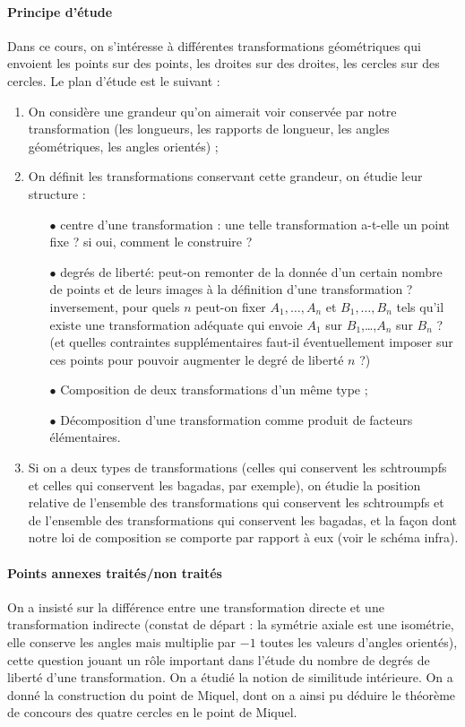\ifcourt

\paragraph{Principe d'étude} Dans ce cours, on s'intéresse à différentes transformations géométriques qui envoient
les points sur des points, les droites sur des droites, les cercles sur des cercles. Le plan
d'étude est le suivant :
\begin{enumerate}
\item On considère une grandeur qu'on aimerait voir conservée par notre transformation 
(les longueurs, les rapports de longueur, les angles géométriques, les angles orientés) ;
\item On définit les transformations conservant cette grandeur, on étudie leur structure :
\begin{itemize}
\item[$\bullet$] centre d'une transformation : une telle transformation a-t-elle un point fixe ? si oui, comment le construire ? 
\item[$\bullet$] \og degrés de liberté\fg : peut-on remonter de la donnée
d'un certain nombre de points et de leurs images à la définition d'une transformation ?
inversement, pour quels $n$ peut-on fixer $A_1,\ldots,A_n$ et $B_1,\ldots,B_n$ tels qu'il
existe une transformation adéquate qui envoie $A_1$ sur $B_1$,\ldots,$A_n$ sur $B_n$ ?
(et quelles contraintes supplémentaires faut-il éventuellement imposer sur ces points pour
pouvoir augmenter le degré de liberté $n$ ?)
\item[$\bullet$] Composition de deux transformations d'un même type ;
\item[$\bullet$] Décomposition d'une transformation comme produit de facteurs \og élémentaires\fg.
\end{itemize}
\item Si on a deux types de transformations (celles qui conservent les schtroumpfs et celles
qui conservent les bagadas, par exemple), on étudie la position relative de l'ensemble
des transformations qui conservent les schtroumpfs et de l'ensemble des transformations qui 
conservent les bagadas, et la façon dont notre loi de composition se comporte par rapport 
à eux (voir le schéma infra).
\end{enumerate}

\paragraph{Points annexes traités/non traités} On a insisté sur la différence entre une 
transformation directe et une transformation indirecte (constat de
départ : la symétrie axiale est une isométrie, elle conserve les angles mais 
multiplie par $-1$ toutes les valeurs d'angles orientés), cette question jouant un
rôle important dans l'étude du nombre de degrés de liberté d'une transformation. 
On a étudié la notion de similitude intérieure. On a donné la construction du 
point de Miquel, dont on a ainsi pu déduire le théorème de concours des quatre 
cercles en le point de Miquel.

